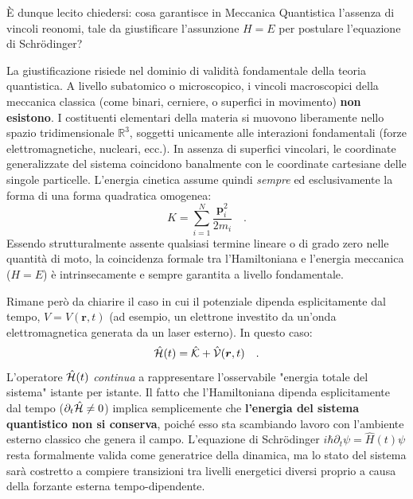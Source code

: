 È dunque lecito chiedersi: cosa garantisce in Meccanica Quantistica l'assenza di vincoli reonomi, tale da giustificare l'assunzione ${H} = {E}$ per postulare l'equazione di Schrödinger?

La giustificazione risiede nel dominio di validità fondamentale della teoria quantistica. A livello subatomico o microscopico, i vincoli macroscopici della meccanica classica (come binari, cerniere, o superfici in movimento) \textbf{non esistono}. I costituenti elementari della materia si muovono liberamente nello spazio tridimensionale $\mathbb{R}^3$, soggetti unicamente alle interazioni fondamentali (forze elettromagnetiche, nucleari, ecc.). 
In assenza di superfici vincolari, le coordinate generalizzate del sistema coincidono banalmente con le coordinate cartesiane delle singole particelle. L'energia cinetica assume quindi \emph{sempre} ed esclusivamente la forma di una forma quadratica omogenea:
\begin{equation*}
    K = \sum_{i=1}^N \frac{\bm{p}_i^2}{2m_i} \quad.
\end{equation*}
Essendo strutturalmente assente qualsiasi termine lineare o di grado zero nelle quantità di moto, la coincidenza formale tra l'Hamiltoniana e l'energia meccanica (${H} = E$) è intrinsecamente e sempre garantita a livello fondamentale.

Rimane però da chiarire il caso in cui il potenziale dipenda esplicitamente dal tempo, $V = V(\bm{r}, t)$ (ad esempio, un elettrone investito da un'onda elettromagnetica generata da un laser esterno). In questo caso:
\begin{equation*}
    \hat{\mathcal{H}}(t) = \hat{\mathcal{K}} + \hat{\mathcal{V}}(\bm{r}, t) \quad.
\end{equation*}
L'operatore $\hat{\mathcal{H}}(t)$ \emph{continua} a rappresentare l'osservabile "energia totale del sistema" istante per istante. Il fatto che l'Hamiltoniana dipenda esplicitamente dal tempo ($\partial_t \hat{\mathcal{H}} \neq 0$) implica semplicemente che \textbf{l'energia del sistema quantistico non si conserva}, poiché esso sta scambiando lavoro con l'ambiente esterno classico che genera il campo. L'equazione di Schrödinger $i\hbar\partial_t \psi = \hat{H}(t)\psi$ resta formalmente valida come generatrice della dinamica, ma lo stato del sistema sarà costretto a compiere transizioni tra livelli energetici diversi proprio a causa della forzante esterna tempo-dipendente.


